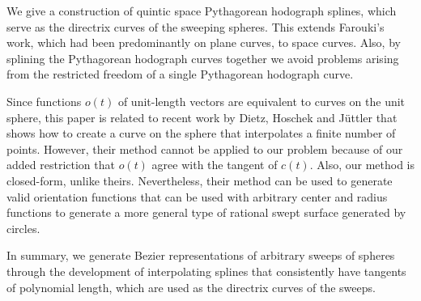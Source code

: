 We give a construction of quintic space Pythagorean hodograph splines,
which serve as the directrix curves of the sweeping spheres.
This extends Farouki's work, which had been predominantly on plane curves,
to space curves.
Also, by splining the Pythagorean hodograph curves 
together we avoid problems arising from the restricted freedom
of a single Pythagorean hodograph curve.

Since functions $o(t)$ of unit-length vectors
are equivalent to curves on the unit sphere,
this paper is related to recent work by Dietz, Hoschek and J\"uttler
that shows how to create a curve on the sphere that interpolates
a finite number of points.
However, their method cannot be applied to our problem
because of our added restriction that $o(t)$ agree with the tangent of $c(t)$.
Also, our method is closed-form, unlike theirs.
Nevertheless, their method can be used to generate valid orientation
functions that can be used with arbitrary center and radius functions
to generate a more general type of rational swept surface generated
by circles.

In summary, we generate Bezier representations
of arbitrary sweeps of spheres through the development of 
interpolating splines that consistently have tangents of polynomial length,
which are used as the directrix curves of the sweeps.


